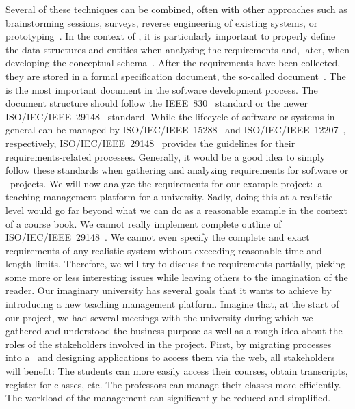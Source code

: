 Several of these techniques can be combined, often with other approaches such as brainstorming sessions, surveys, reverse engineering of existing systems, or prototyping~\cite{I2018SAH,Z2003RDARS}.
In the context of \dbs, it is particularly important to properly define the data structures and entities when analysing the requirements and, later, when developing the conceptual schema~\cite{M1987DFADSMFDRACS}.%
%
\endhsection%
%
%
After the requirements have been collected, they are stored in a formal specification document, the so-called  document~\cite{S2010DSRSAR,W2004ASOTMFMTQOTRSD}.
The  is the most important document in the software development process.
The document structure should follow the IEEE~830~\cite{IEEE1998IRPFSRS} standard or the newer ISO/IEC/IEEE~29148~\cite{ISOIECIEEE2018SASELCPRE} standard.
While the lifecycle of software or systems in general can be managed by ISO/IEC/IEEE~15288~\cite{ISOIECIEEE2023SASESLCP} and ISO/IEC/IEEE~12207~\cite{ISOIECIEEE2017SASESLCP}, respectively, ISO/IEC/IEEE~29148~\cite{ISOIECIEEE2018SASELCPRE} provides the guidelines for their requirements-related processes.
Generally, it would be a good idea to simply follow these standards when gathering and analyzing requirements for software or \db\ projects.%
\endhsection%
%
%
%
We will now analyze the requirements for our example project:~a teaching management platform for a university.
Sadly, doing this at a realistic level would go far beyond what we can do as a reasonable example in the context of a course book.
We cannot really implement complete outline of ISO/IEC/IEEE~29148~\cite{ISOIECIEEE2018SASELCPRE}.
We cannot even specify the complete and exact requirements of any realistic system without exceeding reasonable time and length limits.
Therefore, we will try to discuss the requirements partially, picking some more or less interesting issues while leaving others to the imagination of the reader.%
%
%
%
Our imaginary university has several goals that it wants to achieve by introducing a new teaching management platform.
Imagine that, at the start of our project, we had several meetings with the university during which we gathered and understood the business purpose as well as a rough idea about the roles of the stakeholders involved in the project.
%
%
First, by migrating processes into a \db\ and designing applications to access them via the web, all stakeholders will benefit:
The students can more easily access their courses, obtain transcripts, register for classes, etc.
The professors can manage their classes more efficiently.
The workload of the management can significantly be reduced and simplified.

